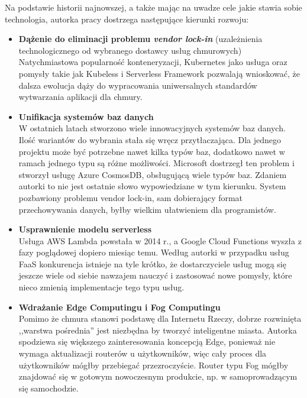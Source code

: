 \documentclass[12pt,a4paper,twoside,titlepage,openright]{book}
\begin{document}
Na podstawie historii najnowszej, a także mając na uwadze cele jakie stawia sobie technologia, autorka pracy dostrzega następujące kierunki rozwoju:
\begin{itemize}
\item \textbf{Dążenie do eliminacji problemu \textit{vendor lock-in}} (uzależnienia technologicznego od wybranego dostawcy usług chmurowych) \\
Natychmiastowa popularność konteneryzacji, Kubernetes jako usługa oraz pomysły takie jak Kubeless i Serverless Framework pozwalają wnioskować, że dalsza ewolucja dąży do wypracowania uniwersalnych standardów wytwarzania aplikacji dla chmury.

\item \textbf{Unifikacja systemów baz danych} \\
W ostatnich latach stworzono wiele innowacyjnych systemów baz danych. Ilość wariantów do wybrania stała się wręcz przytłaczająca. Dla jednego projektu może być potrzebne nawet kilka typów baz, dodatkowo nawet w ramach jednego typu są różne możliwości. Microsoft dostrzegł ten problem i stworzył usługę Azure CosmosDB, obsługującą wiele typów baz. Zdaniem autorki to nie jest ostatnie słowo wypowiedziane w tym kierunku. System pozbawiony problemu vendor lock-in, sam dobierający format przechowywania danych, byłby wielkim ułatwieniem dla programistów.

\item \textbf{Usprawnienie modelu serverless} \\
Usługa AWS Lambda powstała w 2014 r., a Google Cloud Functions wyszła z fazy poglądowej dopiero miesiąc temu. Według autorki w przypadku usług FaaS konkurencja istnieje na tyle krótko, że dostarczyciele usług mogą się jeszcze wiele od siebie nawzajem nauczyć i zastosować nowe pomysły, które nieco zmienią implementacje tego typu usług. 

\item \textbf{Wdrażanie Edge Computingu i Fog Computingu} \\
Pomimo że chmura stanowi podstawę dla Internetu Rzeczy, dobrze rozwinięta ,,warstwa pośrednia'' jest niezbędna by tworzyć inteligentne miasta. Autorka spodziewa się większego zainteresowania koncepcją Edge, ponieważ nie wymaga aktualizacji routerów u użytkowników, więc cały proces dla użytkowników mógłby przebiegać przezroczyście. Router typu Fog mógłby znajdować się w gotowym nowoczesnym produkcie, np. w samoprowadzącym się samochodzie. 


\end{itemize}
\end{document}
